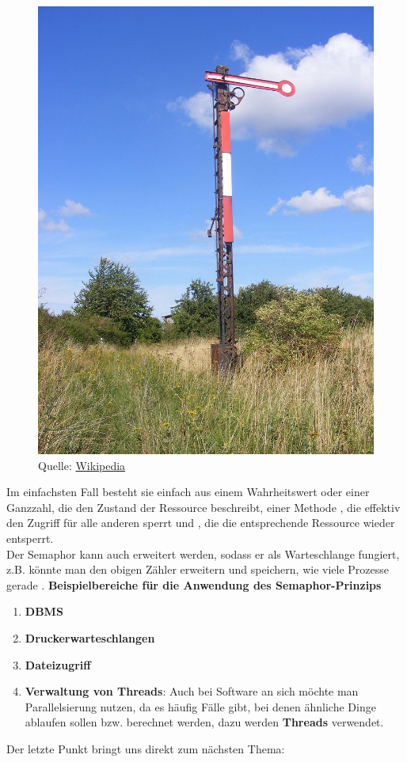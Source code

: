 \documentclass{article}
\begin{document}
\begin{figure}[H]
\begin{minipage}{0.6\textwidth}
    \end{minipage}
    \begin{minipage}{0.4\textwidth}
        \centering
        \includegraphics[scale=0.2]{../media/semaphor.jpg}
        \caption{Quelle: \href{https://de.wikipedia.org/wiki/Semaphor_(Informatik)}{Wikipedia}}
    \end{minipage}
\end{figure}

Im einfachsten Fall besteht sie einfach aus einem Wahrheitswert oder einer Ganzzahl, die den Zustand der Ressource beschreibt, einer Methode , die effektiv den Zugriff für alle anderen sperrt und , die die entsprechende Ressource wieder entsperrt. \\
Der Semaphor kann auch erweitert werden, sodass er als Warteschlange fungiert, z.B. könnte man den obigen Zähler erweitern und speichern, wie viele Prozesse gerade .
\textbf{Beispielbereiche für die Anwendung des Semaphor-Prinzips}
\begin{enumerate}
    \item \textbf{DBMS}
    \item \textbf{Druckerwarteschlangen}
    \item \textbf{Dateizugriff}
    \item \textbf{Verwaltung von Threads}: Auch bei Software an sich möchte man Parallelsierung nutzen, da es häufig Fälle gibt, bei denen ähnliche Dinge  ablaufen sollen bzw. berechnet werden, dazu werden \textbf{Threads} verwendet. 
\end{enumerate}
Der letzte Punkt bringt uns direkt zum nächsten Thema: 
\end{document}
